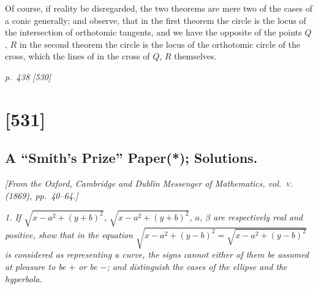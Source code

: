 \documentclass[11pt,a4paper]{book}
\begin{document}
Of course, if reality be disregarded, the two theorems are mere two of the cases of a conic generally; and observe, that in the first theorem the circle is the locus of the intersection of orthotomic tangents, and we have the opposite of the points $Q$, $R$ in the second theorem the circle is the locus of the orthotomic circle of the cross, which the lines of in the cross of $Q$, $R$ themselves.

\clearpage

\bigskip
\textit{p.~438 [530]}
\smallskip

\section{[531]}
\subsection{A ``Smith's Prize'' Paper(*); Solutions.}

\begin{center}
\textit{[From the Oxford, Cambridge and Dublin Messenger of Mathematics, vol.~\textsc{v}. (1869), pp.~40--64.]}
\end{center}

\textit{1. If $\sqrt{x - a^2 + (y + b)^2}$, $\sqrt{x - a^2 + (y + b)^2}$, $a$, $\beta$ are respectively real and positive, show that in the equation $\sqrt{x - a^2 + (y - b)^2 = \sqrt{x - a^2 + (y - b)^2}}$ is considered as representing a curve, the signs cannot either of them be assumed at pleasure to be $+$ or be $-$; and distinguish the cases of the ellipse and the hyperbola.}
\end{document}
